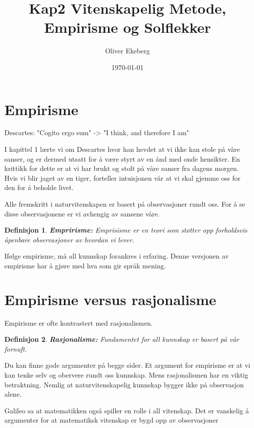 \documentclass[11pt]{article}
\title{Kap2 Vitenskapelig Metode, Empirisme og Solflekker}
\author{Oliver Ekeberg}
\date{\today}
\newtheorem{definition}{Definisjon}
\begin{document}
\maketitle


\section{Empirisme}

Descartes: "Cogito ergo sum" -> "I think, and therefore I am"


I kapittel 1 lærte vi om Descartes hvor han hevdet at vi ikke kan stole på våre sanser, og er dermed utsatt for å være styrt av en ånd med onde hensikter. 
En krittikk for dette er at vi har brukt og stolt på våre sanser fra dagens morgen. Hvis vi blir jaget av en tiger, forteller 
intuisjonen vår at vi skal gjemme oss for den for å beholde livet.

Alle fremskritt i naturvitenskapen er basert på observasjoner rundt oss. For å se disse observasjonene er vi avhengig av sansene våre.


\begin{definition}
    \textbf{Empririsme:} Emprisisme er en teori som støtter opp forholdsvis åpenbare observasjoner av hvordan vi lever.
\end{definition}


Ifølge empirisme, må all kunnskap forankres i erfaring. Denne versjonen av empirisme har å gjøre med hva som gir språk mening.


\section{Empirisme versus rasjonalisme}

Empirisme er ofte kontrastert med rasjonalismen.

\begin{definition}
    \textbf{Rasjonalisme:} Fundamentet for all kunnskap er basert på vår fornuft.
\end{definition}

Du kan finne gode argumenter på begge sider. Et argument for empirisme er at vi kan tenke selv og obervere rundt oss kunnskap. 
Mens rasjonalismen har en viktig betraktning. Nemlig at naturvitenskapelig kunnskap bygger ikke på observasjon alene. 

Galileo sa at matematikken også spiller en rolle i all vitenskap. Det er vanskelig å argumenter for at matematiksk vitenskap er bygd opp av observasjoner
\end{document}

